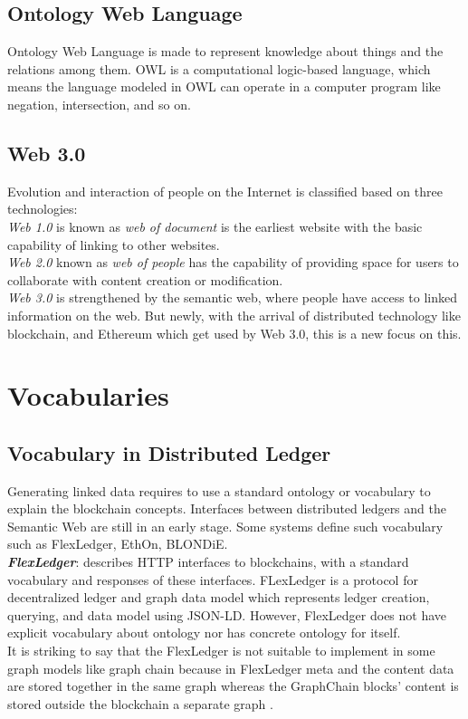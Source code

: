 \subsection{Ontology Web Language }
Ontology Web Language is made to represent knowledge about things and the relations among them. OWL is a computational logic-based language, which means the language modeled in OWL can operate in a computer program like negation, intersection, and so on\cite{Hector}.
\subsection{Web 3.0}\cite{Hector}
Evolution and interaction of people on the Internet is classified based on three technologies:\\
\textit{Web 1.0} is known as \textit{web of document} is the earliest website with the basic capability of linking to other websites.\\
\textit{Web 2.0} known as \textit{web of people} has the capability of providing space for users to collaborate with content creation or modification.\\
\textit{Web 3.0} is strengthened by the semantic web, where people have access to linked information on the web. But newly, with the arrival of distributed technology like blockchain, and Ethereum which get used by Web 3.0, this is a new focus on this.
\section{Vocabularies}
\subsection{Vocabulary in Distributed Ledger}

Generating linked data requires to use a standard ontology or vocabulary to explain the blockchain concepts. Interfaces between distributed ledgers and the Semantic Web are still in an early stage. Some systems define such vocabulary such as FlexLedger, EthOn, BLONDiE\cite{Third}.\\

\textbf{\textit{FlexLedger}}: describes HTTP interfaces to blockchains, with a standard vocabulary and responses of these interfaces. FLexLedger is a protocol for decentralized ledger and graph data model which represents ledger creation, querying, and data model using JSON-LD. However, FlexLedger does not have explicit vocabulary about ontology nor has concrete ontology for itself. \\
It is striking to say that the FlexLedger is not suitable to implement in some graph models like graph chain because in FlexLedger meta and the content data are stored together in the same graph whereas the GraphChain blocks’ content is stored outside the blockchain a separate graph \cite{Sopek}.\\

